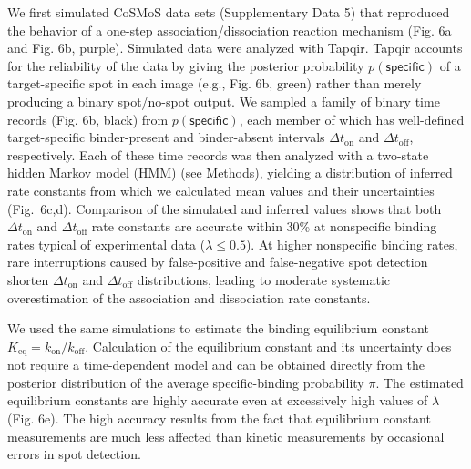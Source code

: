 We first simulated CoSMoS data sets (Supplementary Data 5) that reproduced the behavior of a one-step association/dissociation reaction mechanism (Fig. 6a and Fig. 6b, purple). Simulated data were analyzed with Tapqir.   Tapqir accounts for the reliability of the data by giving the posterior probability $p(\mathsf{specific})$ of a target-specific spot in each image (e.g., Fig. 6b, green) rather than merely producing a binary spot/no-spot output. We sampled a family of binary time records (Fig. 6b, black) from $p(\mathsf{specific})$, each member of which has well-defined target-specific binder-present and binder-absent intervals $\Delta t_\mathrm{on}$ and $\Delta t_\mathrm{off}$, respectively. Each of these time records was then analyzed with a two-state hidden Markov model (HMM) (see Methods), yielding a distribution of inferred rate constants from which we calculated mean values and their uncertainties (Fig.~6c,d). Comparison of the simulated and inferred values shows that both $\Delta t_\mathrm{on}$ and $\Delta t_\mathrm{off}$ rate constants are accurate within 30\% at nonspecific binding rates typical of experimental data ($\lambda \leq 0.5$). At higher nonspecific binding rates, rare interruptions caused by false-positive and false-negative spot detection shorten $\Delta t_\mathrm{on}$ and $\Delta t_\mathrm{off}$ distributions, leading to moderate systematic overestimation of the association and dissociation rate constants.

We used the same simulations to estimate the binding equilibrium constant $K_\mathrm{eq} = k_\mathrm{on}/k_\mathrm{off}$.  Calculation of the equilibrium constant and its uncertainty does not require a time-dependent model and can be obtained directly from the posterior distribution of the average specific-binding probability $\pi$. The estimated equilibrium constants are highly accurate even at excessively  high values of $\lambda$ (Fig. 6e).  The high accuracy results from the fact that equilibrium constant measurements are much less affected than kinetic measurements by occasional errors in spot detection. 

